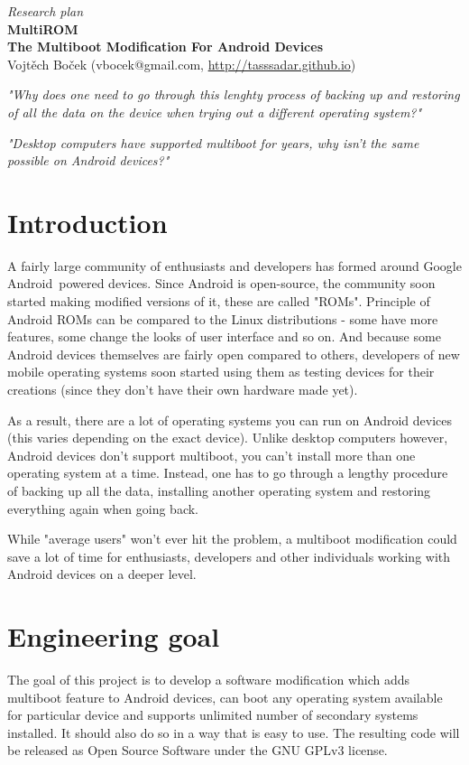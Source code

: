 \documentclass[12pt, a4paper, oneside]{article}
\newcommand{\B}{\textbf} %
\newcommand{\It}{\textit}  %
\begin{document}
\begin{center}
\Large \It{Research plan}\\
\vspace{5mm}
\Large
\B{MultiROM} \\
\large
\B{The Multiboot Modification For Android Devices} \\
\normalsize
Vojtěch Boček (vbocek@gmail.com, \url{http://tasssadar.github.io})
\end{center}

\vspace{5mm}

\It{"Why does one need to go through this lenghty process of backing up and restoring of all the data on the device when trying out a different operating system?"}

\It{"Desktop computers have supported multiboot for years, why isn't the same possible on Android devices?"}

\section{Introduction}
A fairly large community of enthusiasts and developers has formed around Google Android\texttrademark~powered devices. Since Android is open-source, the community soon started making modified versions of it, these are called "ROMs"\cite{whatisrom}. Principle of Android ROMs can be compared to the Linux distributions - some have more features, some change the looks of user interface and so on. And because some Android devices themselves are fairly open compared to others, developers of new mobile operating systems soon started using them as testing devices for their creations (since they don't have their own hardware made yet).

As a result, there are a lot of operating systems you can run on Android devices (this varies depending on the exact device). Unlike desktop computers however, Android devices don't support multiboot, you can't install more than one operating system at a time. Instead, one has to go through a lengthy procedure of backing up all the data, installing another operating system and restoring everything again when going back.

While "average users" won't ever hit the problem, a multiboot modification could save a lot of time for enthusiasts, developers and other individuals working with Android devices on a deeper level.

\section{Engineering goal}
The goal of this project is to develop a software modification which adds multiboot feature to Android devices, can boot any operating system available for particular device and supports unlimited number of secondary systems installed. It should also do so in a way that is easy to use. The resulting code will be released as Open Source Software under the GNU GPLv3 license.
\end{document}
